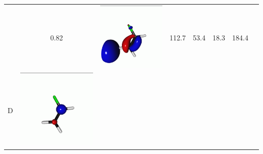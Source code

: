 \documentclass[journal=jctcce,manuscript=article]{achemso}
\begin{document}
\begin{table}[H]
\begin{tabular}{ c | c c c | c c c c}
\begin{minipage}{0.2\textwidth}
     \end{minipage}
     & 0.82
     &  \begin{minipage}{0.2\textwidth}
         \centering
         \includegraphics[scale=0.10]{NTO/CH2CHF/4p.png}
     \end{minipage}
     & 112.7
     & 53.4
     & 18.3
     & 184.4
     \\
                  D &  
     \begin{minipage}{0.2\textwidth}
         \centering
         \includegraphics[scale=0.10]{NTO/CH2CHF/8h.png}

\end{minipage}
\end{tabular}
\end{table}
\end{document}
